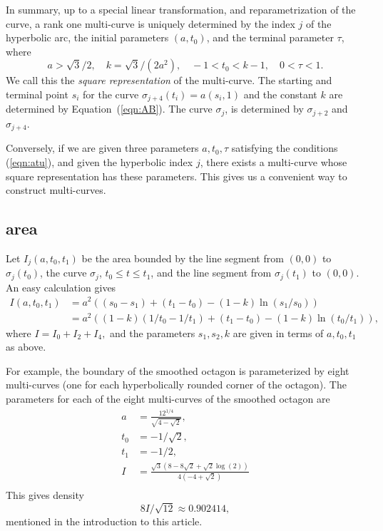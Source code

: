 \documentclass[11pt]{amsart}
\def\ta{{\tau}}
\begin{document}
In summary, up to a special linear transformation, and
reparametrization of the curve, a rank one multi-curve is uniquely
determined by the index $j$ of the hyperbolic arc, the initial
parameters $(a,t_0)$, and the terminal parameter $\ta$, where
  \begin{equation}\label{eqn:atu}
  a > \sqrt{3}/2,\quad  k = \sqrt{3}/(2a^2),\quad -1 < t_0 < k - 1,
  \quad 0 < \ta < 1.
  \end{equation}
  We call this the {\it square representation} of the multi-curve.
  The starting and terminal point $s_i$ for the curve
  $\sigma_{j+4}(t_i) = a(s_i,1)$ and the constant $k$ are determined
  by Equation~(\ref{eqn:AB}).  The curve $\sigma_{j}$, is determined
  by $\sigma_{j+2}$ and $\sigma_{j+4}$.

Conversely, if we are given three parameters $a,t_0,\ta$ satisfying
the conditions (\ref{eqn:atu}), and given the hyperbolic index $j$, 
there exists a multi-curve whose
square representation has these parameters.  This gives us a convenient
way to construct multi-curves.  

\subsection{area}

Let $I_j(a,t_0,t_1)$ be the area bounded by the line segment from
$(0,0)$ to $\sigma_j(t_0)$, the curve $\sigma_j$, $t_0\le t\le t_1$,
and the line segment from $\sigma_j(t_1)$ to $(0,0)$.  An easy
calculation gives
\begin{equation}\label{eqn:I}
\begin{array}{lll}
 I(a,t_0,t_1) &=
  a^2((s_0-s_1)+(t_1-t_0) - (1-k)\ln (s_1/s_0))\\
 &= a^2 ((1-k) (1/t_0-1/t_1) + (t_1-t_0) -(1-k) \ln (t_0/t_1)),
\end{array}
\end{equation}
where 
$I=I_0+I_2+I_4,$ and the parameters $s_1,s_2,k$ are given in terms
of $a,t_0,t_1$ as above.

For example, the boundary of the 
smoothed octagon is parameterized by eight multi-curves (one for
each hyperbolically rounded corner of the octagon).  The parameters
for each of the eight multi-curves of the smoothed octagon are
$$
\begin{array}{lll}
a &= \frac{12^{1/4}}{\sqrt{4-\sqrt{2}}},\\
t_0 &= -1/\sqrt{2},\\
t_1 &= -1/2,\\
I &= \frac{\sqrt{3} \left(8-8 \sqrt{2}+\sqrt{2} \log (2)\right)}{4
   \left(-4+\sqrt{2}\right)}\\
\end{array}
$$
This gives density
$$8 I/\sqrt{12} \approx 0.902414,$$
mentioned in the introduction to this article.
\end{document}
